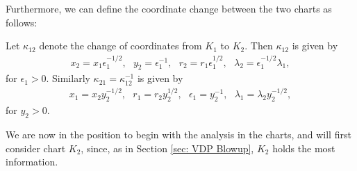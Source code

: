 Furthermore, we can define the coordinate change between the two charts as follows:
\begin{lemma}
Let $\kappa_{12}$ denote the change of coordinates from $K_1$ to $K_2$. Then $\kappa_{12}$ is given by
\begin{align*}
x_2 = x_1 \epsilon_1^{-1/2}, \ \ \ y_2 = \epsilon_1^{-1}, \ \ \ r_2 = r_1 \epsilon_1^{1/2}, \ \ \ \lambda_2 = \epsilon_1^{-1/2} \lambda_1,
\end{align*}
for $\epsilon_1 >0$.
Similarly $\kappa_{21}=\kappa_{12}^{-1}$ is given by
\begin{align*}
x_1 = x_2 y_2 ^{-1/2}, \ \ \ r_1 = r_2 y_2 ^{1/2}, \ \ \ \epsilon_1 = y_2^{-1}, \ \ \ \lambda_1 = \lambda_2 y_2^{-1/2},
\end{align*}
for $y_2 >0$.
\end{lemma}

We are now in the position to begin with the analysis in the charts, and will first consider chart $K_2$, since, as in Section \ref{sec: VDP Blowup}, $K_2$ holds the most information. 

